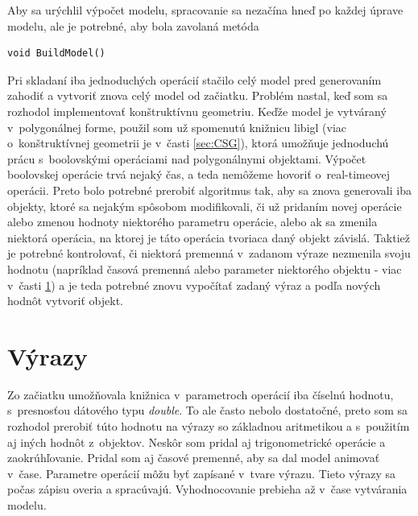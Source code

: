Aby sa urýchlil výpočet modelu, spracovanie sa nezačína hneď po každej úprave modelu, ale je potrebné, aby bola zavolaná metóda 
\begin{lstlisting}
void BuildModel()
\end{lstlisting}
Pri skladaní iba jednoduchých operácií stačilo celý model pred generovaním zahodiť a vytvoriť znova celý model od začiatku. Problém nastal, keď som sa rozhodol implementovať konštruktívnu geometriu. Keďže model je vytváraný v~polygonálnej forme, použil som už spomenutú knižnicu libigl (viac o~konštruktívnej geometrii je v~časti \ref{sec:CSG}), ktorá umožňuje jednoduchú prácu s~boolovskými operáciami nad polygonálnymi objektami. Výpočet boolovskej operácie trvá nejaký čas, a teda nemôžeme hovoriť o~real-timeovej operácii. Preto bolo potrebné prerobiť algoritmus tak, aby sa znova generovali iba objekty, ktoré sa nejakým spôsobom modifikovali, či už pridaním novej operácie alebo zmenou hodnoty niektorého parametru operácie, alebo ak sa zmenila niektorá operácia, na ktorej je táto operácia tvoriaca daný objekt závislá. Taktiež je potrebné kontrolovať, či niektorá premenná v~zadanom výraze nezmenila svoju hodnotu (napríklad časová premenná alebo parameter niektorého objektu - viac v~časti \ref{sec:vyrazy}) a je teda potrebné znovu vypočítať zadaný výraz a podľa nových hodnôt vytvoriť objekt. 

\section{Výrazy}
\label{sec:vyrazy}
Zo začiatku umožňovala knižnica v~parametroch operácií iba číselnú hodnotu, s~presnosťou dátového typu \textit{double}. To ale často nebolo dostatočné, preto som sa rozhodol prerobiť túto hodnotu na výrazy so základnou aritmetikou a s~použitím aj iných hodnôt z~objektov. Neskôr som pridal aj trigonometrické operácie a zaokrúhľovanie. Pridal som aj  časové premenné, aby sa dal model animovať v~čase.
Parametre operácií môžu byť zapísané v~tvare výrazu. Tieto výrazy sa počas zápisu overia a spracúvajú. Vyhodnocovanie prebieha až v~čase vytvárania modelu.

